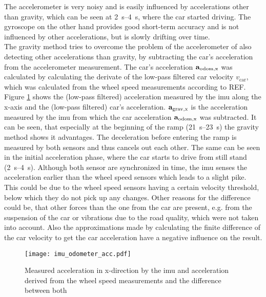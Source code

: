 The accelerometer is very noisy and is easily influenced by accelerations other than gravity, which can be seen at \SIrange{2}{4}{\second}, where the car started driving.
The gyroscope on the other hand provides good short-term accuracy and is not influenced by other accelerations, but is slowly drifting over time.\\
The gravity method tries to overcome the problem of the accelerometer of also detecting other accelerations than gravity, by subtracting the car's acceleration from the accelerometer measurement.
The car's acceleration $\vb{a}_\mathrm{odom,x} $ was calculated by calculating the derivate of the low-pass filtered car velocity $v_\mathrm{car} $, which was calculated from the wheel speed measurements according to REF.
Figure \ref{fig:imu_odometer_acc} shows the (low-pass filtered) acceleration measured by the \gls{imu} along the x-axis and the (low-pass filtered) car's acceleration.
$\vb{a}_\mathrm{grav,x} $ is the acceleration measured by the \gls{imu} from which the car acceleration $\vb{a}_\mathrm{odom,x} $ was subtracted.
It can be seen, that especially at the beginning of the ramp (\SIrange{21}{23}{\second}) the gravity method shows it advantages.
The deceleration before entering the ramp is measured by both sensors and thus cancels out each other.
The same can be seen in the initial acceleration phase, where the car starts to drive from still stand (\SIrange[]{2}{4}{\second}).
Although both sensor are synchronized in time, the \gls{imu} senses the acceleration earlier than the wheel speed sensors which leads to a slight pike.
This could be due to the wheel speed sensors having a certain velocity threshold, below which they do not pick up any changes.
Other reasons for the difference could be, that other forces than the one from the car are present, e.g. from the suspension of the car or vibrations due to the road quality, which were not taken into account.
Also the approximations made by calculating the finite difference of the car velocity to get the car acceleration have a negative influence on the result.
\begin{figure}[htbp]
	\centering
	\texttt{[image: imu\_odometer\_acc.pdf]}
	\caption[Acceleration from \gls{imu} and odometer]{Measured acceleration in x-direction by the \gls{imu} and acceleration derived from the wheel speed measurements and the difference between both}
	\label{fig:imu_odometer_acc}
\end{figure}
